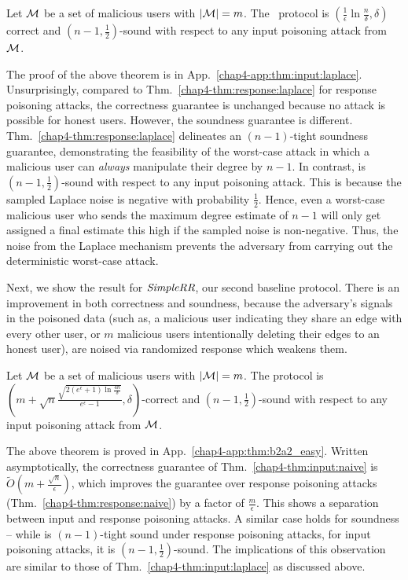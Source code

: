  \begin{thm} Let $\mathcal{M}$ be a set of malicious users with $|\mathcal{M}| = m$. The \RLap~protocol is $(\frac{1}{\epsilon}\ln\frac{n}{\delta},\delta)$ correct and $(n-1,\frac{1}{2})$-sound with respect to any input poisoning attack from $\mathcal{M}$. \label{chap4-thm:input:laplace}\end{thm}
The proof of the above theorem is in App.~\ref{chap4-app:thm:input:laplace}.
Unsurprisingly, compared to Thm.~\ref{chap4-thm:response:laplace} for response poisoning attacks, the correctness guarantee is unchanged because no attack is possible for honest users. However, the soundness guarantee is different. Thm.~\ref{chap4-thm:response:laplace} delineates an $(n-1)$-tight soundness guarantee, demonstrating the feasibility of the worst-case attack in which a malicious user can \textit{always} manipulate their degree by $n-1$. In contrast, \RLap{} is $(n-1, \frac{1}{2})$-sound with respect to any input poisoning attack. This is because the sampled Laplace noise is negative with probability $\frac{1}{2}$.  Hence, even a worst-case malicious user who sends the maximum degree estimate of $n-1$ will only get assigned a final estimate this high if the sampled noise is non-negative. Thus, the noise from the Laplace mechanism prevents the adversary from carrying out the deterministic worst-case attack.

Next, we show the result for $\textit{SimpleRR}{}$, our second baseline protocol. There is an improvement in both correctness and soundness, because the adversary's signals in the poisoned data (such as, a malicious user indicating they share an edge with every other user, or $m$ malicious users intentionally deleting their edges to an honest user), are noised via randomized response which weakens them.

\begin{thm}\label{chap4-thm:b2a2_easy}  Let $\mathcal{M}$ be a set of malicious users with $|\mathcal{M}| = m$. The \DegRRNaive{} protocol is $(m+\sqrt{n}\frac{\sqrt{2(e^\epsilon+1) \ln \frac{4n}{\delta}}}{e^\epsilon-1},\delta)$-correct and $(n-1,\frac{1}{2})$-sound with respect to any input poisoning attack from $\mathcal{M}$.\label{chap4-thm:input:naive}
\end{thm}
The above theorem is proved in App.~\ref{chap4-app:thm:b2a2_easy}.
Written asymptotically, the correctness guarantee of Thm.~\ref{chap4-thm:input:naive} is $\tilde{O}(m + \frac{\sqrt{n}}{\epsilon})$, which improves the guarantee over response poisoning attacks (Thm.~\ref{chap4-thm:response:naive}) by a factor of $\frac{m}{\epsilon}$. This shows  a separation between input and response poisoning attacks.  A similar case holds for soundness -- while \DegRRNaive{} is $(n-1)$-tight sound under response poisoning attacks, for input poisoning attacks, it is $(n-1, \frac{1}{2})$-sound. The implications of this observation are similar to those of Thm.~\ref{chap4-thm:input:laplace} as discussed above.

